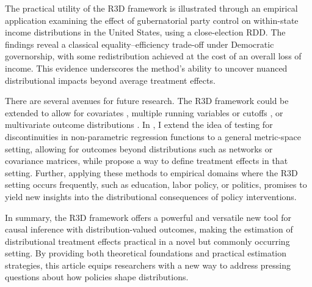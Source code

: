 \documentclass[12pt]{article}
\begin{document}
The practical utility of the R3D framework is illustrated through an empirical application examining the effect of gubernatorial party control on within-state income distributions in the United States, using a close-election RDD. The findings reveal a classical equality--efficiency trade-off under Democratic governorship, with some redistribution achieved at the cost of an overall loss of income. This evidence underscores the method’s ability to uncover nuanced distributional impacts beyond average treatment effects.

There are several avenues for future research. The R3D framework could be extended to allow for covariates \citep{jin2025identification, frolich2019including}, multiple running variables or cutoffs \citep{bertanha2020regression, gunsilius2023distributional, cheng2023estimation, cattaneo2016interpreting}, or multivariate outcome distributions \citep{chen2023sliced}. In \citet{van2025test}, I extend the idea of testing for discontinuities in non-parametric regression functions to a general metric-space setting, allowing for outcomes beyond distributions such as networks or covariance matrices, while \citet{kurisu2025regression} propose a way to define treatment effects in that setting. Further, applying these methods to empirical domains where the R3D setting occurs frequently, such as education, labor policy, or politics, promises to yield new insights into the distributional consequences of policy interventions.

In summary, the R3D framework offers a powerful and versatile new tool for causal inference with distribution-valued outcomes, making the estimation of distributional treatment effects practical in a novel but commonly occurring setting. By providing both theoretical foundations and practical estimation strategies, this article equips researchers with a new way to address pressing questions about how policies shape distributions. 

\clearpage



\clearpage
\appendix

\setcounter{table}{0}
\setcounter{figure}{0}
\setcounter{theorem}{0}
\setcounter{equation}{0}

\renewcommand{\thetable}{A-\arabic{table}}
\renewcommand{\thefigure}{A-\arabic{figure}}
\renewcommand{\thesection}{A-\arabic{section}}
\renewcommand{\thetheorem}{A-\arabic{theorem}}
\renewcommand{\theproposition}{A-\arabic{proposition}}
\renewcommand{\thelemma}{A-\arabic{lemma}}
\renewcommand{\thecorollary}{A-\arabic{corollary}}
\renewcommand{\theequation}{A-\arabic{equation}}
\renewcommand{\thedefinition}{A-\arabic{definition}}
\end{document}
